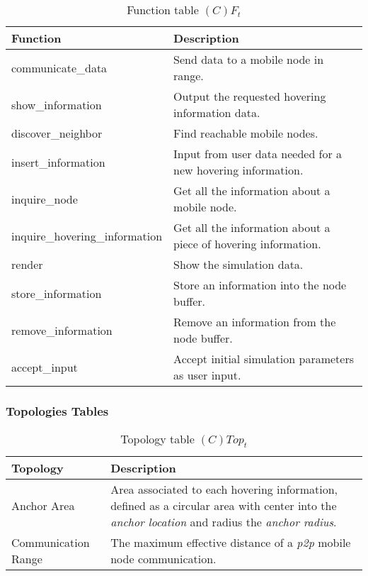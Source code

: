 \begin{table}[H]
	\centering
	\begin{tabular}{|p{5cm}|p{7cm}|}
			\hline
			\textbf{Function} & \textbf{Description} \\
			\hline
			communicate\_data & Send data to a mobile node in range.\\
			\hline
			show\_information & Output the requested hovering information data.\\
			\hline
			discover\_neighbor & Find reachable mobile nodes.\\
			\hline
			insert\_information & Input from user data needed for a new hovering
			information.\\
			\hline
			inquire\_node & Get all the information about a mobile node.\\
			\hline
			inquire\_hovering\_information & Get all the information about a piece of
			hovering information. \\
			\hline
			render & Show the simulation data. \\
			\hline
			store\_information & Store an information into the node buffer. \\
			\hline
			remove\_information & Remove an information from the node buffer. \\
			\hline
			accept\_input & Accept initial simulation parameters as user input. \\
			\hline
		\end{tabular}
	\caption{Function table $(C)F_t$}
	\label{tab:cft}
\end{table}

\subsubsection{Topologies Tables}

\begin{table}[H]
	\centering
	\begin{tabular}{|p{4cm}|p{8cm}|}
			\hline
			\textbf{Topology} & \textbf{Description} \\
			\hline
			Anchor Area & Area associated to each hovering information, defined as a
			circular area with center into the \emph{anchor location} and radius the
			\emph{anchor radius}.\\
			\hline
			Communication Range & The maximum effective distance of a \emph{p2p}
			mobile node communication. \\
			\hline
		\end{tabular}
	\caption{Topology table $(C)Top_t$}
	\label{tab:ctopt}
\end{table}

